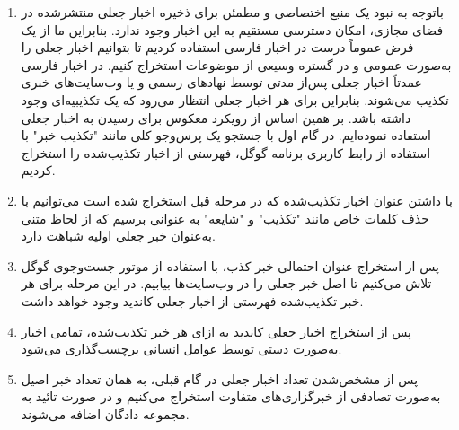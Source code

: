 \begin{enumerate}
\item باتوجه‌ به نبود یک منبع اختصاصی و مطمئن برای ذخیره اخبار جعلی منتشرشده در فضای مجازی، امکان دسترسی مستقیم به این اخبار وجود ندارد. بنابراین ما از یک فرض عموماً درست در اخبار فارسی استفاده کردیم تا بتوانیم اخبار جعلی را به‌صورت عمومی و در گستره وسیعی از موضوعات استخراج کنیم. در اخبار فارسی عمدتاً اخبار جعلی پس‌از مدتی توسط نهاد‌های رسمی و یا وب‌سایت‌های خبری تکذیب می‌شوند. بنابراین برای هر اخبار جعلی انتظار می‌رود که یک تکذیبیه‌ای وجود داشته باشد. بر همین اساس از رویکرد معکوس برای رسیدن به اخبار جعلی استفاده نموده‌ایم. در گام اول با جستجو یک پرس‌و‌جو کلی مانند "تکذیب خبر" با استفاده از رابط کاربری برنامه گوگل، فهرستی از اخبار تکذیب‌شده را استخراج کردیم.
\item با داشتن عنوان اخبار تکذیب‌شده که در مرحله قبل استخراج شده‌ است می‌توانیم با حذف کلمات خاص مانند "تکذیب" و "شایعه" به عنوانی برسیم که از لحاظ متنی به‌عنوان خبر جعلی اولیه شباهت دارد.

\item پس از استخراج عنوان احتمالی خبر کذب، با استفاده از موتور جست‌وجوی گوگل تلاش می‌کنیم تا اصل خبر جعلی را در وب‌سایت‌ها بیابیم. در این مرحله برای هر  خبر تکذیب‌شده فهرستی از اخبار جعلی کاندید وجود خواهد داشت.

\item پس از استخراج اخبار جعلی کاندید به ازای هر خبر تکذیب‌شده، تمامی اخبار   به‌صورت دستی توسط عوامل انسانی برچسب‌گذاری می‌شود.

\item پس از مشخص‌شدن تعداد اخبار جعلی در گام قبلی، به همان تعداد خبر اصیل به‌صورت تصادفی از خبرگزاری‌های متفاوت استخراج می‌کنیم و در صورت تائید به مجموعه‌ دادگان اضافه می‌شوند.
\end{enumerate}

